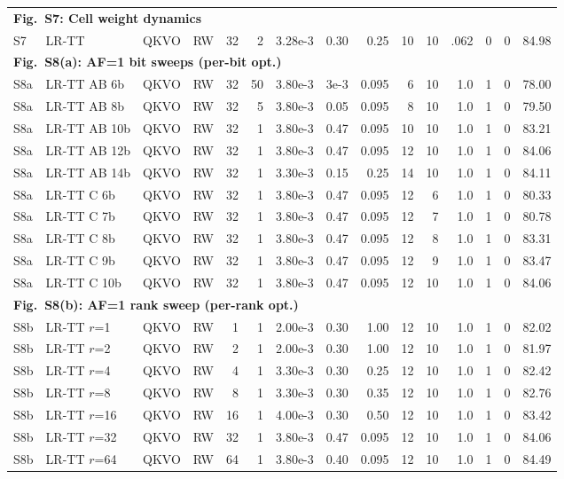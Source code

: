 \documentclass[AMA,LATO1COL]{WileyNJDv5}
\begin{document}
{\begin{longtable}{@{}l l l l r r r r r r r r r r r@{}}
\multicolumn{15}{l}{\cellcolor{HeadGray}\textbf{Fig.~S7: Cell weight dynamics}} \\
S7 & LR-TT & QKVO & RW & 32 & 2 & 3.28e-3 & 0.30 & 0.25 & 10 & 10 & .062 & 0 & 0 & 84.98 \\
\midrule

\multicolumn{15}{l}{\cellcolor{HeadGray}\textbf{Fig.~S8(a): AF=1 bit sweeps (per-bit opt.)}} \\
S8a & LR-TT AB 6b & QKVO & RW & 32 & 50 & 3.80e-3 & 3e-3 & 0.095 & 6 & 10 & 1.0 & 1 & 0 & 78.00 \\
S8a & LR-TT AB 8b & QKVO & RW & 32 & 5 & 3.80e-3 & 0.05 & 0.095 & 8 & 10 & 1.0 & 1 & 0 & 79.50 \\
S8a & LR-TT AB 10b & QKVO & RW & 32 & 1 & 3.80e-3 & 0.47 & 0.095 & 10 & 10 & 1.0 & 1 & 0 & 83.21 \\
S8a & LR-TT AB 12b & QKVO & RW & 32 & 1 & 3.80e-3 & 0.47 & 0.095 & 12 & 10 & 1.0 & 1 & 0 & 84.06 \\
S8a & LR-TT AB 14b & QKVO & RW & 32 & 1 & 3.30e-3 & 0.15 & 0.25 & 14 & 10 & 1.0 & 1 & 0 & 84.11 \\
S8a & LR-TT C 6b & QKVO & RW & 32 & 1 & 3.80e-3 & 0.47 & 0.095 & 12 & 6 & 1.0 & 1 & 0 & 80.33 \\
S8a & LR-TT C 7b & QKVO & RW & 32 & 1 & 3.80e-3 & 0.47 & 0.095 & 12 & 7 & 1.0 & 1 & 0 & 80.78 \\
S8a & LR-TT C 8b & QKVO & RW & 32 & 1 & 3.80e-3 & 0.47 & 0.095 & 12 & 8 & 1.0 & 1 & 0 & 83.31 \\
S8a & LR-TT C 9b & QKVO & RW & 32 & 1 & 3.80e-3 & 0.47 & 0.095 & 12 & 9 & 1.0 & 1 & 0 & 83.47 \\
S8a & LR-TT C 10b & QKVO & RW & 32 & 1 & 3.80e-3 & 0.47 & 0.095 & 12 & 10 & 1.0 & 1 & 0 & 84.06 \\
\midrule

\multicolumn{15}{l}{\cellcolor{HeadGray}\textbf{Fig.~S8(b): AF=1 rank sweep (per-rank opt.)}} \\
S8b & LR-TT $r$=1 & QKVO & RW & 1 & 1 & 2.00e-3 & 0.30 & 1.00 & 12 & 10 & 1.0 & 1 & 0 & 82.02 \\
S8b & LR-TT $r$=2 & QKVO & RW & 2 & 1 & 2.00e-3 & 0.30 & 1.00 & 12 & 10 & 1.0 & 1 & 0 & 81.97 \\
S8b & LR-TT $r$=4 & QKVO & RW & 4 & 1 & 3.30e-3 & 0.30 & 0.25 & 12 & 10 & 1.0 & 1 & 0 & 82.42 \\
S8b & LR-TT $r$=8 & QKVO & RW & 8 & 1 & 3.30e-3 & 0.30 & 0.35 & 12 & 10 & 1.0 & 1 & 0 & 82.76 \\
S8b & LR-TT $r$=16 & QKVO & RW & 16 & 1 & 4.00e-3 & 0.30 & 0.50 & 12 & 10 & 1.0 & 1 & 0 & 83.42 \\
S8b & LR-TT $r$=32 & QKVO & RW & 32 & 1 & 3.80e-3 & 0.47 & 0.095 & 12 & 10 & 1.0 & 1 & 0 & 84.06 \\
S8b & LR-TT $r$=64 & QKVO & RW & 64 & 1 & 3.80e-3 & 0.40 & 0.095 & 12 & 10 & 1.0 & 1 & 0 & 84.49 \\
\midrule


\end{longtable}}
\end{document}
